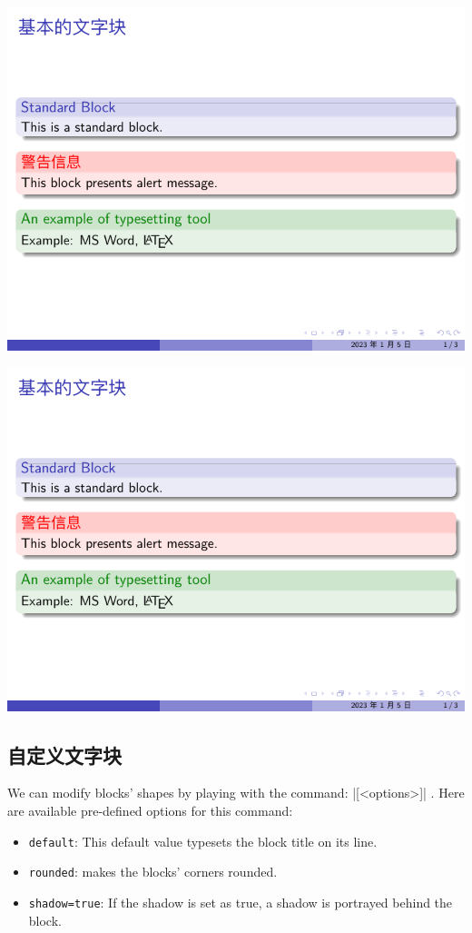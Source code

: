 \includegraphics[page=2]{examples/beamer/beamerblock04.pdf}

\includegraphics[page=3]{examples/beamer/beamerblock04.pdf}

\subsection{自定义文字块}

We can modify blocks’ shapes by playing with the command: 
|[<options>]|
. Here are available pre-defined options for this command:

\begin{itemize}
  \item \verb|default|: This default value typesets the block title on its line.
  \item \verb|rounded|: makes the blocks’ corners rounded.
  \item \verb|shadow=true|: If the shadow is set as true, a shadow is portrayed behind the block.
\end{itemize}

